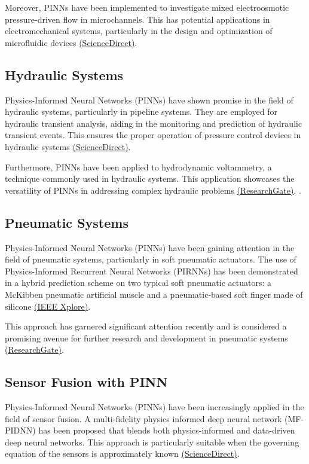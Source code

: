 \documentclass[12pt]{article}
\begin{document}
	Moreover, PINNs have been implemented to investigate mixed electroosmotic pressure-driven flow in microchannels. This has potential applications in electromechanical systems, particularly in the design and optimization of microfluidic devices \href{https://www.sciencedirect.com/science/article/pii/S0255270123002775}{(ScienceDirect)}.
	
	
	\subsection{Hydraulic Systems}
	Physics-Informed Neural Networks (PINNs) have shown promise in the field of hydraulic systems, particularly in pipeline systems. They are employed for hydraulic transient analysis, aiding in the monitoring and prediction of hydraulic transient events. This ensures the proper operation of pressure control devices in hydraulic systems \href{https://www.sciencedirect.com/science/article/pii/S0043135422007771}{(ScienceDirect)}. 
	
	Furthermore, PINNs have been applied to hydrodynamic voltammetry, a technique commonly used in hydraulic systems. This application showcases the versatility of PINNs in addressing complex hydraulic problems \href{https://www.researchgate.net/publication/359856117_The_Application_of_Physics-Informed_Neural_Networks_to_Hydrodynamic_Voltammetry}{(ResearchGate)}.
	.
	
	\subsection{Pneumatic Systems}
	Physics-Informed Neural Networks (PINNs) have been gaining attention in the field of pneumatic systems, particularly in soft pneumatic actuators. The use of Physics-Informed Recurrent Neural Networks (PIRNNs) has been demonstrated in a hybrid prediction scheme on two typical soft pneumatic actuators: a McKibben pneumatic artificial muscle and a pneumatic-based soft finger made of silicone \href{https://ieeexplore.ieee.org/document/9783081}{(IEEE Xplore)}. 
	
	This approach has garnered significant attention recently and is considered a promising avenue for further research and development in pneumatic systems \href{https://www.researchgate.net/publication/360907965_Physics-Informed_Recurrent_Neural_Networks_for_Soft_Pneumatic_Actuators}{(ResearchGate)}.
	
	
	\subsection{Sensor Fusion with PINN}
	Physics-Informed Neural Networks (PINNs) have been increasingly applied in the field of sensor fusion. A multi-fidelity physics informed deep neural network (MF-PIDNN) has been proposed that blends both physics-informed and data-driven deep neural networks. This approach is particularly suitable when the governing equation of the sensors is approximately known \href{https://www.sciencedirect.com/science/article/pii/S0021999120307166}{(ScienceDirect)}. 
	
\end{document}

